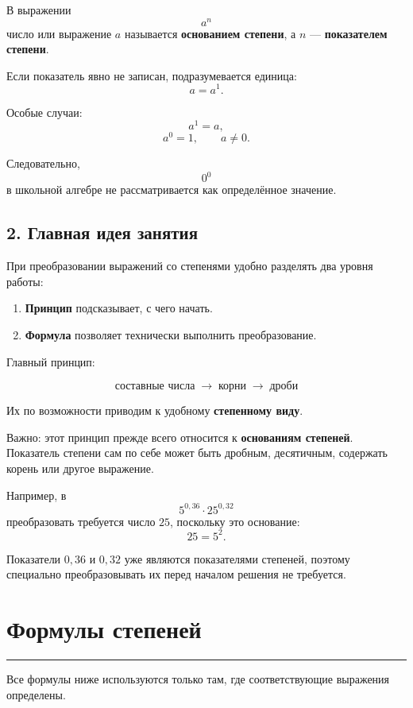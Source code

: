 \documentclass[a4paper,12pt]{article}
\newcommand{\lessonrule}{%
  \par\vspace{0.3em}
  {\color{accent}\rule{\linewidth}{0.6pt}}
  \vspace{0.5em}
}
\newcommand{\important}[1]{\textbf{\color{darkaccent}#1}}
\begin{document}
В выражении
\[
a^n
\]
число или выражение \(a\) называется \important{основанием степени},
а \(n\) --- \important{показателем степени}.

Если показатель явно не записан, подразумевается единица:
\[
a=a^1.
\]

Особые случаи:
\[
a^1=a,
\]
\[
a^0=1,\qquad a\ne0.
\]

Следовательно,
\[
0^0
\]
в школьной алгебре не рассматривается как определённое значение.

\subsection*{\color{accent}2. Главная идея занятия}

При преобразовании выражений со степенями удобно разделять два уровня работы:

\begin{enumerate}
  \item \important{Принцип} подсказывает, с чего начать.
  \item \important{Формула} позволяет технически выполнить преобразование.
\end{enumerate}

Главный принцип:

\[
\boxed{
\text{составные числа}
\;\longrightarrow\;
\text{корни}
\;\longrightarrow\;
\text{дроби}
}
\]

Их по возможности приводим к удобному \important{степенному виду}.

Важно: этот принцип прежде всего относится к \important{основаниям степеней}.
Показатель степени сам по себе может быть дробным, десятичным,
содержать корень или другое выражение.

Например, в
\[
5^{0,36}\cdot25^{0,32}
\]
преобразовать требуется число \(25\), поскольку это основание:
\[
25=5^2.
\]

Показатели \(0,36\) и \(0,32\) уже являются показателями степеней,
поэтому специально преобразовывать их перед началом решения не требуется.

\section*{\color{darkaccent}Формулы степеней}
\lessonrule

Все формулы ниже используются только там, где соответствующие выражения
определены.
\end{document}
